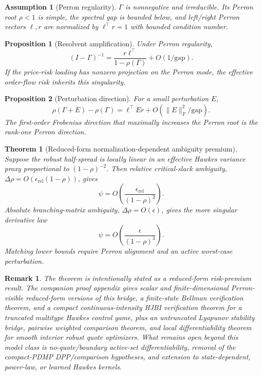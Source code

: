 \documentclass[review]{siamonline250211}
\newtheorem{theorem}{Theorem}
\newtheorem{proposition}{Proposition}
\newtheorem{assumption}{Assumption}
\newtheorem{remark}{Remark}
\begin{document}
\begin{assumption}[Perron regularity]
$\Gamma$ is nonnegative and irreducible. Its Perron root $\rho<1$ is simple,
the spectral gap is bounded below, and left/right Perron vectors $\ell,r$ are
normalized by $\ell^\top r=1$ with bounded condition number.
\end{assumption}

\begin{proposition}[Resolvent amplification]
Under Perron regularity,
\[
(I-\Gamma)^{-1}
 =
\frac{r\ell^\top}{1-\rho(\Gamma)} + O(1/\mathrm{gap}).
\]
If the price-risk loading has nonzero projection on the Perron mode, the
effective order-flow risk inherits this singularity.
\end{proposition}

\begin{proposition}[Perturbation direction]
For a small perturbation $E$,
\[
\rho(\Gamma+E)-\rho(\Gamma)
 =
\ell^\top E r + O(\|E\|_F^2/\mathrm{gap}).
\]
The first-order Frobenius direction that maximally increases the Perron root is
the rank-one Perron direction.
\end{proposition}

\begin{theorem}[Reduced-form normalization-dependent ambiguity premium]
Suppose the robust half-spread is locally linear in an effective Hawkes
variance proxy proportional to $(1-\rho)^{-2}$. Then relative critical-slack
ambiguity, $\Delta\rho=O(\epsilon_{\mathrm{rel}}(1-\rho))$, gives
\[
\psi = O\!\left(\frac{\epsilon_{\mathrm{rel}}}{(1-\rho)^2}\right).
\]
Absolute branching-matrix ambiguity, $\Delta\rho=O(\epsilon)$, gives the more
singular derivative law
\[
\psi = O\!\left(\frac{\epsilon}{(1-\rho)^3}\right).
\]
Matching lower bounds require Perron alignment and an active worst-case
perturbation.
\end{theorem}

\begin{remark}
The theorem is intentionally stated as a reduced-form risk-premium result. The
companion proof appendix gives scalar and finite-dimensional Perron-visible
reduced-form versions of this bridge, a finite-state Bellman verification
theorem, and a compact continuous-intensity HJBI verification theorem for a
truncated multitype Hawkes control game, plus an untruncated Lyapunov stability
bridge, pairwise weighted comparison theorem, and local differentiability
theorem for smooth interior robust quote optimizers. What remains open beyond
this model class is no-quote/boundary active-set differentiability, removal of
the compact-PDMP DPP/comparison hypotheses, and extension to state-dependent,
power-law, or learned Hawkes kernels.
\end{remark}
\end{document}
